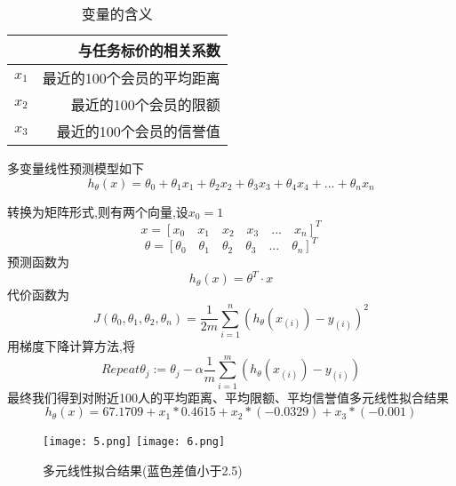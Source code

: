 \documentclass{cumcmthesis}
\begin{document}
\begin{table}[!htbp]
	\caption{变量的含义}\label{tab001} \centering
	\begin{tabular}{lr}
		\toprule[1.5pt]
		& {与任务标价的相关系数} \\
		\midrule[1pt]
		$x_1$ & 最近的100个会员的平均距离 \\
		$x_2$ & 最近的100个会员的限额 \\
		$x_3$ & 最近的100个会员的信誉值 \\
		\bottomrule[1.5pt]
	\end{tabular}%
\end{table}

多变量线性预测模型如下
\begin{equation}
\left.
h_{\theta}(x) =\theta_0+\theta_1x_1+\theta_2x_2+\theta_3x_3+\theta_4x_4+... +\theta_n x_n
\right.
\end{equation}

转换为矩阵形式,则有两个向量,设$x_0=1$
\[x=\left[x_0\quad	x_1\quad	x_2\quad x_3	\quad	...\quad x_n \right]^T\]
\[\theta=\left[\theta_0\quad	\theta_1\quad	\theta_2\quad \theta_3	\quad	...\quad \theta_n \right]^T\]
预测函数为
\begin{equation}
\left.
h_\theta \left(x\right)=\theta^T·x
\right.
\end{equation}
代价函数为
\begin{equation}
\left.
J\left(\theta_0,\theta_1,\theta_2,\theta_n \right)=\frac{1}{2m}\sum_{i=1}^{n} \left(h_\theta\left(x_{\left(i\right)}\right)-y_{\left(i\right)}\right)^2
\right.
\end{equation}
用梯度下降计算方法,将
\begin{equation}
\left.
Repeat\theta_j:=\theta_j-\alpha\frac{1}{m} \sum_{i=1}^{m} \left(h_\theta\left(x_{\left(i\right)}\right)-y_{\left(i\right)}\right)
\right.
\end{equation}
最终我们得到对附近100人的平均距离、平均限额、平均信誉值多元线性拟合结果
\begin{equation}
\left.
h_\theta\left(x\right) = 67.1709 + x_1*0.4615 +x_2*(-0.0329)+x_3*(-0.001)
\right.
\end{equation}

\begin{figure}[!h]
	\centering
	\texttt{[image: 5.png]}
	\texttt{[image: 6.png]}
	\caption{多元线性拟合结果(蓝色差值小于2.5)}
\end{figure}
\end{document}
